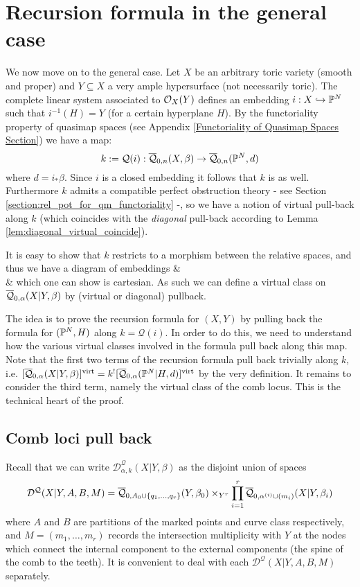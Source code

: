 \section{Recursion formula in the general case}
We now move on to the general case. Let $X$ be an arbitrary toric variety (smooth and proper) and $Y \subseteq X$ a very ample hypersurface (not necessarily toric). The complete linear system associated to $\mathcal{O}_X(Y)$ defines an embedding $i : X \hookrightarrow \mathbb P^N$ such that $i^{-1}(H) = Y$ (for a certain hyperplane $H$). By the functoriality property of quasimap spaces (see Appendix \ref{Functoriality of Quasimap Spaces Section}) we have a map:
\begin{equation*} k := \mathcal Q(i) : \overline{\mathcal Q}_{0,n}(X,\beta) \rightarrow \overline{\mathcal Q}_{0,n}(\mathbb P^N,d) \end{equation*}
where $d=i_*\beta$. Since $i$ is a closed embedding it follows that $k$ is as well. Furthermore $k$ admits a compatible perfect obstruction theory - see Section \ref{section:rel_pot_for_qm_functoriality} -, so we have a notion of virtual pull-back along $k$ (which coincides with the \emph{diagonal} pull-back according to Lemma \ref{lem:diagonal_virtual_coincide}).

It is easy to show that $k$ restricts to a morphism between the relative spaces, and thus we have a diagram of embeddings
\bcd
{} \ar[d, "f", hook] \ar[r, "g", hook]  &  \ar[d, "j", hook] \\
  \ar[r, "k", hook] & 
\ecd
which one can show is cartesian. As such we can define a virtual class on $\overline{\mathcal Q}_{0,\alpha}(X|Y,\beta)$ by (virtual or diagonal) pullback.

The idea is to prove the recursion formula for $(X,Y)$ by pulling back the formula for $(\mathbb P^N,H)$ along $k = \mathcal Q(i)$. In order to do this, we need to understand how the various virtual classes involved in the formula pull back along this map. Note that the first two terms of the recursion formula pull back trivially along $k$, i.e. $[\overline{\mathcal Q}_{0,\alpha}(X|Y,\beta)]^{\operatorname{virt}}=k^![\overline{\mathcal Q}_{0,\alpha}(\mathbb P^N|H,d)]^{\operatorname{virt}}$ by the very definition. It remains to consider the third term, namely the virtual class of the comb locus. This is the technical heart of the proof.

\subsection{Comb loci pull back}
Recall that we can write $\mathcal D^\mathcal{Q}_{\alpha,k}(X|Y,\beta)$ as the disjoint union of spaces
\begin{equation*} \mathcal D^{\mathcal{Q}}(X|Y,A,B,M) = \overline{\mathcal Q}_{0,A_0 \cup \{q_1, \ldots, q_r\}}(Y,\beta_0) \times_{Y^r} \prod_{i=1}^r \overline{\mathcal Q}_{0,\alpha^{(i)}\cup (m_i)}(X|Y,\beta_i) \end{equation*}
where $A$ and $B$ are partitions of the marked points and curve class respectively, and $M=(m_1,\ldots,m_r)$ records the intersection multiplicity with $Y$ at the nodes which connect the internal component to the external components (the spine of the comb to the teeth). It is convenient to deal with each $\mathcal D^{\mathcal{Q}}(X|Y,A,B,M)$ separately.

